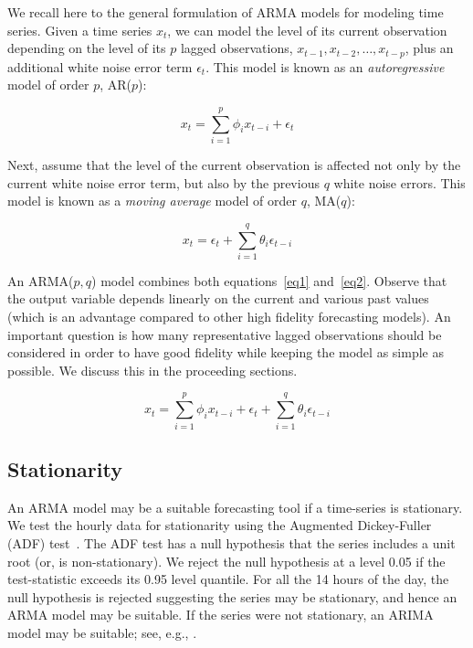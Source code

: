 \documentclass[review]{elsarticle}
\begin{document}
We recall here to the general formulation of  ARMA models for modeling time 
series.  Given a time series $x_t$, we can model the level of its current 
observation depending on the level of its $p$ lagged observations, 
$x_{t-1},x_{t-2}, \ldots, x_{t-p}$, plus an additional white noise error term 
$\epsilon_t$. This model is known as an \textit{autoregressive} model of order 
${p}$, AR($p$):

\begin{equation}\label{eq1}
		x_t = \sum_{i=1}^p  \phi_i x_{t-i}   + \epsilon_t
\end{equation}

Next, assume that the level of the current observation is affected not only 
by the current white noise error term, but also by the previous 
$q$ white noise errors. This model is known as a \textit{moving average} 
model of order $q$, MA($q$): 

\begin{equation}\label{eq2}
	x_t = \epsilon_t + \sum_{i=1}^q  \theta_i \epsilon_{t-i}   
\end{equation}

An ARMA($p,q$) model combines both equations~\eqref{eq1} and~\eqref{eq2}. 
Observe that the output variable depends linearly on the current and various 
past values (which is an advantage compared to other high fidelity 
forecasting models). An important question is how many 
representative lagged observations should be considered in order to have good 
fidelity while keeping the model as simple as possible. We discuss this in the 
proceeding sections.


\begin{equation}\label{eq3}
x_t =  \sum_{i=1}^p  \phi_i x_{t-i}    + \epsilon_t + \sum_{i=1}^q  \theta_i \epsilon_{t-i}   
\end{equation}


\subsection{Stationarity}
An ARMA model may be a suitable forecasting tool if a time-series is 
stationary. We test 
the hourly data for stationarity using the Augmented 
Dickey-Fuller (ADF) test~\cite{dickey1979distribution}. The ADF test has a null 
hypothesis that the series includes a unit root (or, is non-stationary). We 
reject the null hypothesis at a level 0.05 if the test-statistic exceeds its 
0.95 level quantile. For all the 14 hours of the day, the null hypothesis is 
rejected suggesting the series may be stationary, and hence an ARMA model may 
be suitable. If the series were not stationary, an ARIMA model may be suitable; 
see, e.g., \cite{contreras2003arima}.
\end{document}
